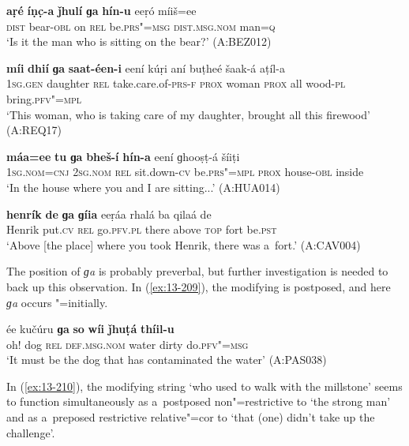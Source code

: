 \ea
\label{ex:13-205}
\gll \textbf{aṛé} \textbf{íṇc̣-a} \textbf{ǰhulí} \textbf{ɡa} \textbf{hín-u} eeṛó  míiš=ee \\
\textsc{dist} bear-\textsc{obl} on \textsc{rel} be.\textsc{prs"=msg} \textsc{dist.msg.nom}   man=\textsc{q} \\
\glt `Is it the man who is sitting on the bear?' (A:BEZ012)

\ex
\label{ex:13-206}
\gll \textbf{míi} \textbf{dhií} \textbf{ɡa} \textbf{saat-éen-i} eení kúṛi  aní buṭheé šaak-á aṭíl-a \\
\textsc{1sg.gen} daughter \textsc{rel} take.care.of-\textsc{prs-f} \textsc{prox} woman \textsc{prox} all wood-\textsc{pl} bring.\textsc{pfv"=mpl} \\
\glt `This woman, who is taking care of my daughter, brought all this firewood' (A:REQ17)

\ex
\label{ex:13-207}
\gll \textbf{máa=ee} \textbf{tu} \textbf{ɡa} \textbf{bheš-í} \textbf{hín-a}  eení ɡhooṣṭ-á šíiṭi\\
\textsc{1sg.nom=cnj} \textsc{2sg.nom} \textsc{rel} sit.down-\textsc{cv} be.\textsc{prs"=mpl} \textsc{prox} house-\textsc{obl} inside\\
\glt `In the house where you and I are sitting...' (A:HUA014)

\ex
\label{ex:13-208}
\gll \label{bkm:Ref190845659}\textbf{henrík} \textbf{de} \textbf{ɡa} \textbf{ɡíia} eeṛáa rhalá ba  qilaá de \\
Henrik put.\textsc{cv} \textsc{rel} go.\textsc{pfv.pl}  there above \textsc{top} fort be.\textsc{pst } \\
\glt `Above [the place] where you took Henrik, there was a~fort.' (A:CAV004) 
\z

The position of \textit{ɡa} is probably preverbal, but further investigation is needed to back up this observation. In (\ref{ex:13-209}), the modifying  is postposed, and here \textit{ɡa} occurs "=initially.

\begin{exe}
\ex
\label{ex:13-209}
\gll ée kučúru \textbf{ɡa} \textbf{so} \textbf{wíi} \textbf{ǰhuṭá} \textbf{thíil-u}  \\
oh! dog \textsc{rel} \textsc{def.msg.nom} water dirty do.\textsc{pfv"=msg} \\
\glt `It must be the dog that has contaminated the water' (A:PAS038) 
\end{exe}

In (\ref{ex:13-210}), the modifying string `who used to walk with the millstone' seems to function simultaneously as a~postposed non"=restrictive  to `the \iliDameli strong man' and as a~preposed restrictive relative"=cor to `that (one) didn't take up the challenge'.

